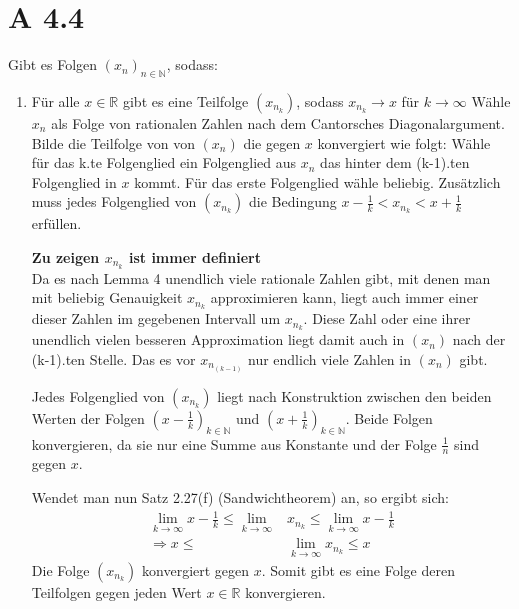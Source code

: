 \documentclass{article}
\begin{document}
    \section*{A 4.4}
        Gibt es Folgen \( {(x_n)}_{n \in \mathbb{N}} \), sodass:
        \begin{enumerate}[ label = (\roman*)]
            \item Für alle \( x \in \mathbb{R} \) gibt es eine Teilfolge \( (x_{n_k}) \), sodass \(x_{n_k} \to x\) für \( k \to \infty \)
            Wähle \(x_n\) als Folge von rationalen Zahlen nach dem Cantorsches Diagonalargument.
            Bilde die Teilfolge von von \((x_n)\) die gegen \(x\) konvergiert wie folgt:
            Wähle für das k.te Folgenglied ein Folgenglied aus \(x_n\) das hinter dem (k-1).ten Folgenglied in \(x\) kommt.
            Für das erste Folgenglied wähle beliebig.
            Zusätzlich muss jedes Folgenglied von \( (x_{n_k}) \) die Bedingung \( x - \frac{1}{k} < x_{n_k} < x + \frac{1}{k} \) erfüllen.

            \textbf{Zu zeigen \(x_{n_k}\) ist immer definiert} \\
            Da es nach Lemma 4 unendlich viele rationale Zahlen gibt, mit denen man mit beliebig Genauigkeit \( x_{n_k} \) approximieren kann,
            liegt auch immer einer dieser Zahlen im gegebenen Intervall um \( x_{n_k} \). Diese Zahl oder eine ihrer unendlich vielen
            besseren Approximation liegt damit auch in \( (x_n) \) nach der (k-1).ten Stelle. Das es vor \(x_{n_{(k-1)}}\) nur endlich viele Zahlen in \( (x_n) \) gibt.

            Jedes Folgenglied von \((x_{n_k})\) liegt nach Konstruktion zwischen den beiden Werten der Folgen
            \( {(x - \frac{1}{k}) }_{k \in \mathbb{N}}\) und \( { (x + \frac{1}{k}) }_{k \in \mathbb{N}} \).
            Beide Folgen konvergieren, da sie nur eine Summe aus Konstante und der Folge \(\frac{1}{n}\) sind gegen \(x\).

            Wendet man nun Satz 2.27(f) (Sandwichtheorem) an, so ergibt sich:
            \begin{align*}
                \lim_{k \to \infty} x - \frac{1}{k} \leq \lim_{k \to \infty} &x_{n_k} \leq \lim_{k \to \infty} x - \frac{1}{k} \\
                \Rightarrow x \leq &\lim_{k \to \infty} x_{n_k} \leq x
            \end{align*}
            Die Folge \((x_{n_k})\) konvergiert gegen \(x\).
            Somit gibt es eine Folge deren Teilfolgen gegen jeden Wert \( x \in \mathbb{R} \) konvergieren.
            

\end{enumerate}
\end{document}
